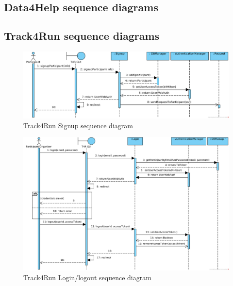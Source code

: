 \documentclass[a4paper, hidelinks, 12pt]{report}
\begin{document}
	\subsection{Data4Help sequence diagrams}
	
	\subsection{Track4Run sequence diagrams}
	\begin{figure}[H]
		\centering
		\includegraphics[width=1\textwidth]{diagrams/sequence_diagrams/t4r_signup_participant.png}
		\caption[Track4Run Signup sequence diagram]{Track4Run Signup sequence diagram}
		\label{fig:t4r_seq_signup}
	\end{figure}
	
	\begin{figure}[H]
		\centering
		\includegraphics[width=1\textwidth]{diagrams/sequence_diagrams/t4r_login_logout.png}
		\caption[Track4Run Login/logout sequence diagram]{Track4Run Login/logout sequence diagram}
		\label{fig:t4r_seq_login}
	\end{figure}
	
\end{document}
